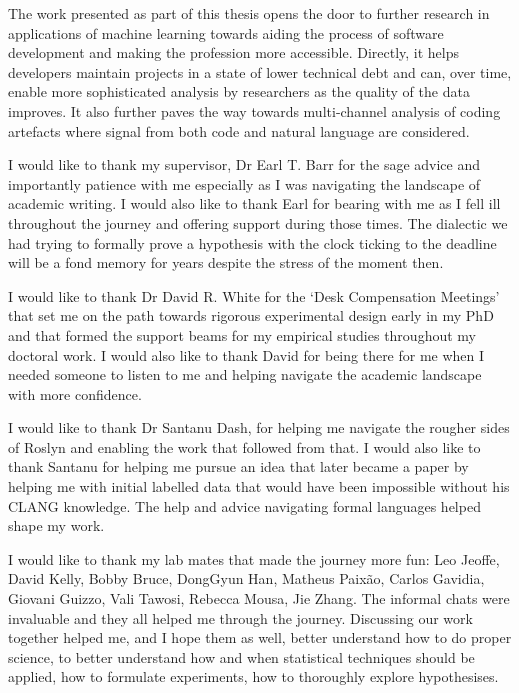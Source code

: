 \begin{impactstatement}
The work presented as part of this thesis opens the door to further research in applications of machine learning towards aiding the process of software development and making the profession more accessible. Directly, it helps developers maintain projects in a state of lower technical debt and can, over time, enable more sophisticated analysis by researchers as the quality of the data improves. It also further paves the way towards multi-channel analysis of coding artefacts where signal from both code and natural language are considered. 
\end{impactstatement}

\begin{acknowledgements}
I would like to thank my supervisor, Dr Earl T. Barr for the sage advice and
importantly patience with me especially as I was navigating the landscape of
academic writing. I would also like to thank Earl for bearing with me as I fell
ill throughout the journey and offering support during those times. The
dialectic we had trying to formally prove a hypothesis with the clock ticking to
the deadline will be a fond memory for years despite the stress of the moment
then.

I would like to thank Dr David R. White for the `Desk Compensation Meetings'
that set me on the path towards rigorous experimental design early in my PhD and
that formed the support beams for my empirical studies throughout my doctoral
work. I would also like to thank David for being there for me when I needed
someone to listen to me and helping navigate the academic landscape with more
confidence.

I would like to thank Dr Santanu Dash, for helping me navigate the rougher sides
of Roslyn and enabling the work that followed from that. I would also like to
thank Santanu for helping me pursue an idea that later became a paper by helping
me with initial labelled data that would have been impossible without his CLANG
knowledge. The help and advice navigating formal languages helped shape my work.

I would like to thank my lab mates that made the journey more fun: Leo Jeoffe,
David Kelly, Bobby Bruce, DongGyun Han, Matheus Paix\~ao, Carlos Gavidia,
Giovani Guizzo, Vali Tawosi, Rebecca Mousa, Jie Zhang. The informal chats were
invaluable and they all helped me through the journey. Discussing our work
together helped me, and I hope them as well, better understand how to do proper
science, to better understand how and when statistical techniques should be
applied, how to formulate experiments, how to thoroughly explore hypothesises.


\end{acknowledgements}
